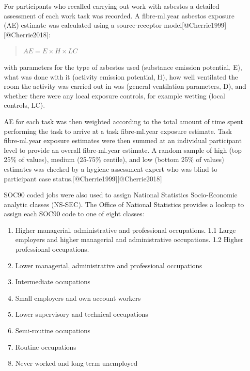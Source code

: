 For participants who recalled carrying out work with asbestos a detailed
assessment of each work task was recorded. A fibre-ml.year asbestos
exposure (AE) estimate was calculated using a source-receptor
model{[}@Cherrie1999{]}{[}@Cherrie2018{]}:

\begin{quote}
\ensuremath{AE = E \times H \times LC}
\end{quote}

with parameters for the type of asbestos used (substance emission
potential, E), what was done with it (activity emission potential, H),
how well ventilated the room the activity was carried out in was
(general ventilation parameters, D), and whether there were any local
exposure controls, for example wetting (local controls, LC).

AE for each task was then weighted according to the total amount of time
spent performing the task to arrive at a task fibre-ml.year exposure
estimate. Task fibre-ml.year exposure estimates were then summed at an
individual participant level to provide an overall fibre-ml.year
estimate. A random sample of high (top 25\% of values), medium (25-75\%
centile), and low (bottom 25\% of values) estimates was checked by a
hygiene assessment expert who was blind to participant case
status.{[}@Cherrie1999{]}{[}@Cherrie2018{]}

SOC90 coded jobs were also used to assign National Statistics
Socio-Economic analytic classes (NS-SEC). The Office of National
Statistics provides a lookup to assign each SOC90 code to one of eight
classes:

\begin{enumerate}
\def\labelenumi{\arabic{enumi}.}
\tightlist
\item
  Higher managerial, administrative and professional occupations. 1.1
  Large employers and higher managerial and administrative occupations.
  1.2 Higher professional occupations.
\item
  Lower managerial, administrative and professional occupations
\item
  Intermediate occupations
\item
  Small employers and own account workers
\item
  Lower supervisory and technical occupations
\item
  Semi-routine occupations
\item
  Routine occupations
\item
  Never worked and long-term unemployed
\end{enumerate}

